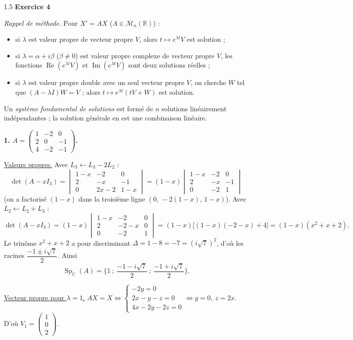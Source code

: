 \documentclass[12pt]{article}
\begin{document}
\begin{spacing}{1.5}
\medskip\textbf{Exercice 4}

\emph{Rappel de méthode.} Pour $X'=AX$ ($A\in\mathcal{M}_n(\mathbb{R})$) :
\begin{itemize}
\item si $\lambda$ est valeur propre de vecteur propre $V$, alors $t\mapsto e^{\lambda t}V$ est solution ;
\item si $\lambda=\alpha+i\beta$ ($\beta\neq0$) est valeur propre complexe de vecteur propre $V$, les fonctions $\operatorname{Re}(e^{\lambda t}V)$ et $\operatorname{Im}(e^{\lambda t}V)$ sont deux solutions réelles ;
\item si $\lambda$ est valeur propre double avec un seul vecteur propre $V$, on cherche $W$ tel que $(A-\lambda I)W=V$ ; alors $t\mapsto e^{\lambda t}(tV+W)$ est solution.
\end{itemize}
Un \emph{système fondamental de solutions} est formé de $n$ solutions linéairement indépendantes ; la solution générale en est une combinaison linéaire.

\textbf{1. $A=\begin{pmatrix}
1 & -2 & 0 \\
2 & 0 & -1 \\
4 & -2 & -1
\end{pmatrix}$.}

\underline{Valeurs propres.} Avec $L_3\leftarrow L_3-2L_2$ :
\[
\det(A-xI_3)=\begin{vmatrix}
1-x & -2 & 0 \\
2 & -x & -1 \\
0 & 2x-2 & 1-x
\end{vmatrix}
=(1-x)\begin{vmatrix}
1-x & -2 & 0 \\
2 & -x & -1 \\
0 & -2 & 1
\end{vmatrix}
\]
(on a factorisé $(1-x)$ dans la troisième ligne $(0,\,-2(1-x),\,1-x)$). Avec $L_2\leftarrow L_2+L_3$ :
\[
\det(A-xI_3)=(1-x)\begin{vmatrix}
1-x & -2 & 0 \\
2 & -2-x & 0 \\
0 & -2 & 1
\end{vmatrix}=(1-x)\big[(1-x)(-2-x)+4\big]=(1-x)(x^2+x+2).
\]
Le trinôme $x^2+x+2$ a pour discriminant $\Delta=1-8=-7=(i\sqrt7)^2$, d'où les racines $\dfrac{-1\pm i\sqrt7}{2}$. Ainsi
\[
\operatorname{Sp}_{\mathbb{C}}(A)=\Big\{1\ ;\ \frac{-1-i\sqrt7}{2}\ ;\ \frac{-1+i\sqrt7}{2}\Big\}.
\]

\underline{Vecteur propre pour $\lambda=1$.} $AX=X\iff\begin{cases}-2y=0\\2x-y-z=0\\4x-2y-2z=0\end{cases}\iff y=0,\ z=2x$. D'où $V_1=\begin{pmatrix}1\\0\\2\end{pmatrix}$.


\end{spacing}
\end{document}
